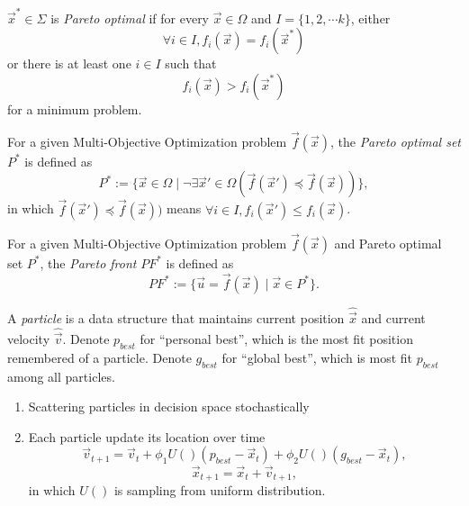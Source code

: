 \documentclass[12pt]{article}
\begin{document}
\begin{mydef}
\label{def:pareto_opt}
$ \vec{x}^{*} \in \Sigma $ is \emph{Pareto optimal} if for every $ \vec{x} \in \Omega $ and $ I = \{ 1, 2, \cdots k \} $, either 
\begin{equation}
\label{eq:po_eq}
\forall i \in I, f_{i}(\vec{x}) = f_{i}(\vec{x}^{*})
\end{equation}
or there is at least one $ i \in I $ such that
\begin{equation}
\label{eq:po_g}
f_{i}(\vec{x}) > f_{i}(\vec{x}^{*})
\end{equation}
for a minimum problem.
\end{mydef}


\begin{mydef}
\label{def:pareto_opt_set}
For a given Multi-Objective Optimization problem $ \vec{f}(\vec{x}) $, the \emph{Pareto optimal set} $ P^{*} $ is defined as
\begin{equation}
\label{eq:pa_opt_set}
P^{*} := \{ \vec{x} \in \Omega \mid \neg \exists \vec{x}' \in \Omega (\vec{f}(\vec{x}') \preceq  \vec{f}(\vec{x})) \},
\end{equation}
in which $ \vec{f}(\vec{x}') \preceq \vec{f}(\vec{x})) $ means $ \forall i \in I, f_{i}(\vec{x}') \leq f_{i}(\vec{x}) $.

\end{mydef}

\begin{mydef}
\label{def:pareto_front}
For a given Multi-Objective Optimization problem $ \vec{f}(\vec{x}) $ and Pareto optimal set $ P^{*} $, the \emph{Pareto front} $ PF^{*} $ is defined as
\begin{equation}
\label{eq:pa_front}
PF^{*} := \{ \vec{u} = \vec{f}(\vec{x}) \mid \vec{x} \in P^{*}  \}.
\end{equation}
\end{mydef}

\begin{mydef}
\label{def:pso}
A \emph{particle} is a data structure that maintains current position $ \hat{\vec{x}} $ and current velocity  $ \hat{\vec{v}} $. Denote $ p_{best} $ for ``personal best'', which is the most fit position remembered of a particle. Denote $ g_{best} $ for ``global best'', which is most fit $ p_{best} $ among all particles. 
\begin{enumerate}
\item Scattering particles in decision space stochastically
\item Each particle update its location over time \\
\begin{equation}
\label{eq:up_vel}
\vec{v}_{t+1} = \vec{v}_{t} + \phi_{1} U() (p_{best} - \vec{x}_{t}) + \phi_{2} U() (g_{best} - \vec{x}_{t}),
\end{equation}
\begin{equation}
\label{eq:up_pos}
\vec{x}_{t+1} = \vec{x}_{t} + \vec{v}_{t+1},
\end{equation}
in which $ U() $ is sampling from uniform distribution.
\end{enumerate}
\end{mydef}
\end{document}
